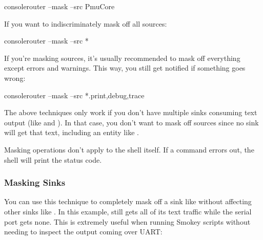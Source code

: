\begin{CommandLine}
consolerouter --mask --src PmuCore
\end{CommandLine}

If you want to indiscriminately mask off all sources:

\begin{CommandLine}
consolerouter --mask --src *
\end{CommandLine}

If you're masking sources, it's usually recommended to mask off everything except errors and warnings. This way, you still get notified if 
something goes wrong:

\begin{CommandLine}
consolerouter --mask --src *.{print,debug,trace}
\end{CommandLine}

\begin{Note}
The above techniques only work if you don't have multiple sinks consuming text output (like  and ). In that case, 
you don't want to mask off sources since no sink will get that text, including an entity like .
\end{Note}

\begin{Note}
Masking operations don't apply to the shell itself. If a command errors out, the shell will print the status code.
\end{Note}

\subsubsection{Masking Sinks}

You can use this technique to completely mask off a sink like  without affecting other sinks like . In this example,  still gets 
all of its text traffic while the serial port gets none. This is extremely useful when running Smokey scripts without needing to inspect the output coming over UART:

